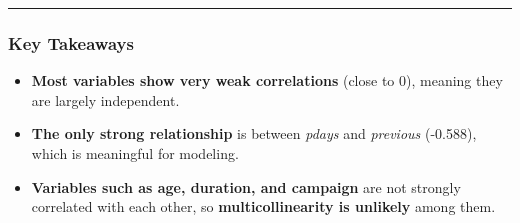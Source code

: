 \documentclass[
]{article}
\providecommand{\tightlist}{%
  \setlength{\itemsep}{0pt}\setlength{\parskip}{0pt}}
\begin{document}
\begin{center}\rule{0.5\linewidth}{0.5pt}\end{center}

\subsubsection{Key Takeaways}\label{key-takeaways}

\begin{itemize}
\tightlist
\item
  \textbf{Most variables show very weak correlations} (close to 0),
  meaning they are largely independent.\\
\item
  \textbf{The only strong relationship} is between \emph{pdays} and
  \emph{previous} (-0.588), which is meaningful for modeling.\\
\item
  \textbf{Variables such as age, duration, and campaign} are not
  strongly correlated with each other, so \textbf{multicollinearity is
  unlikely} among them.
\end{itemize}
\end{document}
